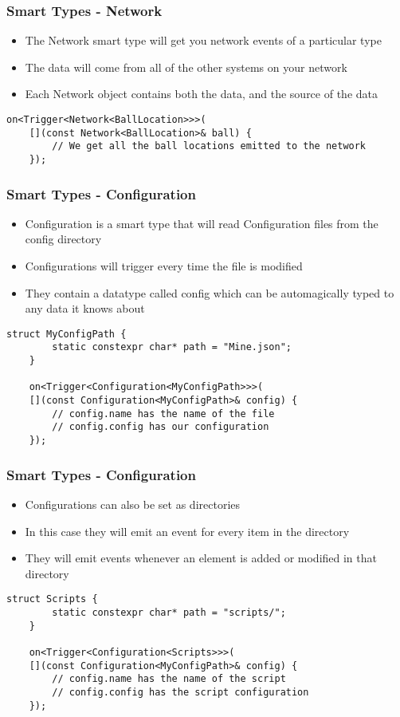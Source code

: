 \documentclass{beamer}
\begin{document}
\begin{frame}[fragile]
	\frametitle{Smart Types - Network}
	\begin{itemize}
		\item The Network smart type will get you network events of a particular type
		\item The data will come from all of the other systems on your network
		\item Each Network object contains both the data, and the source of the data
	\end{itemize}
	
	\begin{lstlisting}[language=nuclear]
	on<Trigger<Network<BallLocation>>>(
	[](const Network<BallLocation>& ball) {
	    // We get all the ball locations emitted to the network
	});
	\end{lstlisting}
\end{frame}

\begin{frame}[fragile]
	\frametitle{Smart Types - Configuration}
	\begin{itemize}
		\item Configuration is a smart type that will read Configuration files from the config directory
		\item Configurations will trigger every time the file is modified
		\item They contain a datatype called config which can be automagically typed to any data it knows about
	\end{itemize}
	
	\begin{lstlisting}[language=nuclear]
	struct MyConfigPath {
	    static constexpr char* path = "Mine.json";
	}
	
	on<Trigger<Configuration<MyConfigPath>>>(
	[](const Configuration<MyConfigPath>& config) {
	    // config.name has the name of the file
	    // config.config has our configuration
	});
	\end{lstlisting}
\end{frame}

\begin{frame}[fragile]
	\frametitle{Smart Types - Configuration}
	
	\begin{itemize}
		\item Configurations can also be set as directories
		\item In this case they will emit an event for every item in the directory
		\item They will emit events whenever an element is added or modified in that directory
	\end{itemize}
	
	\begin{lstlisting}[language=nuclear]
	struct Scripts {
	    static constexpr char* path = "scripts/";
	}
	
	on<Trigger<Configuration<Scripts>>>(
	[](const Configuration<MyConfigPath>& config) {
	    // config.name has the name of the script
	    // config.config has the script configuration
	});
	\end{lstlisting}
\end{frame}
\end{document}
